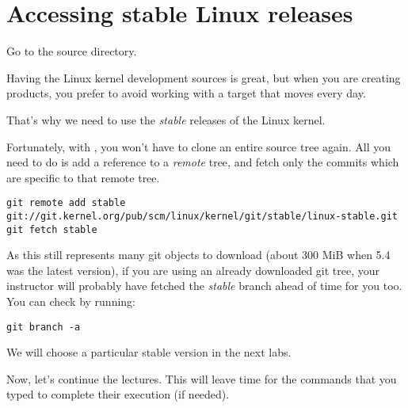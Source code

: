 \section{Accessing stable Linux releases}

Go to the  source directory.

Having the Linux kernel development sources is great, but when you are
creating products, you prefer to avoid working with a target that moves
every day.

That's why we need to use the {\em stable} releases of the Linux
kernel.

Fortunately, with , you won't have to clone an entire source
tree again. All you need to do is add a reference to a {\em remote}
tree, and fetch only the commits which are specific to that remote tree.

{\small
\begin{verbatim}
git remote add stable git://git.kernel.org/pub/scm/linux/kernel/git/stable/linux-stable.git
git fetch stable
\end{verbatim}
}

As this still represents many git objects to download (about 300 MiB when 5.4 was
the latest version), if you are using an already downloaded git tree,
your instructor will probably have fetched the {\em stable} branch ahead
of time for you too. You can check by running:

\begin{verbatim}
git branch -a
\end{verbatim}

We will choose a particular stable version in the next labs.

Now, let's continue the lectures. This will leave time for the commands
that you typed to complete their execution (if needed).
